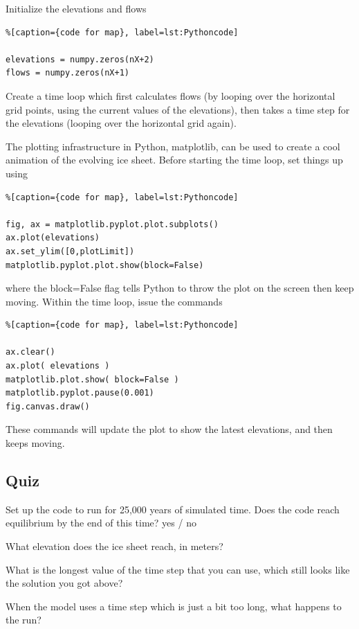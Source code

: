 {Initialize the elevations and flows


\begin{lstlisting}%[caption={code for map}, label=lst:Pythoncode]

elevations = numpy.zeros(nX+2)
flows = numpy.zeros(nX+1)
\end{lstlisting}

Create a time loop which first calculates flows (by looping over the horizontal grid points, using the current values of the elevations), then takes a time step for the elevations (looping over the horizontal grid again).

The plotting infrastructure in Python, matplotlib, can be used to create a cool animation of the evolving ice sheet. Before starting the time loop, set things up using


\begin{lstlisting}%[caption={code for map}, label=lst:Pythoncode]

fig, ax = matplotlib.pyplot.plot.subplots()
ax.plot(elevations)
ax.set_ylim([0,plotLimit])
matplotlib.pyplot.plot.show(block=False)
\end{lstlisting}

where the block=False flag tells Python to throw the plot on the screen then keep moving. Within the time loop, issue the commands

\begin{lstlisting}%[caption={code for map}, label=lst:Pythoncode]

ax.clear()
ax.plot( elevations )
matplotlib.plot.show( block=False )
matplotlib.pyplot.pause(0.001)
fig.canvas.draw()
\end{lstlisting}

These commands will update the plot to show the latest elevations, and then keeps moving.


\subsection{Quiz}\index{}
Set up the code to run for 25,000 years of simulated time. Does the code reach equilibrium by the end of this time?  
yes / no

What elevation does the ice sheet reach, in meters?


What is the longest value of the time step that you can use, which still looks like the solution you got above?


When the model uses a time step which is just a bit too long, what happens to the run?

}
